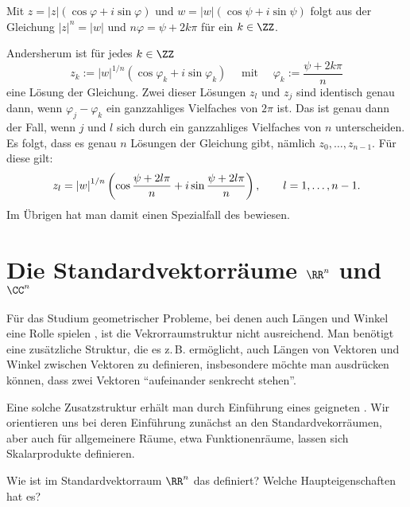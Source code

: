 \begin{antwort}
  Mit 
  $z = |z| (\cos \varphi + i \sin \varphi)$ und 
  $w=  |w| (\cos \psi + i \sin \psi)$ folgt aus der Gleichung  
  $|z|^n = |w|$ und $n\varphi = \psi + 2k\pi$ für ein 
  $k\in \ZZ$.

  Andersherum ist für jedes $k\in\ZZ$ 
  \[
  z_k := \left|w\right|^{1/n}  ( \cos \varphi_k + i\sin \varphi_k ) 
  \quad\text{ mit }\quad
  \varphi_k := \frac{\psi + 2k\pi}{n}
  \]
  eine Lösung der Gleichung. Zwei dieser Lösungen $z_l$ und 
  $z_j$ sind identisch genau dann, wenn $\varphi_j - \varphi_k$ 
  ein ganzzahliges Vielfaches von $2\pi$ ist. 
  Das ist genau dann der Fall, wenn 
  $j$ und $l$ sich durch ein ganzzahliges Vielfaches 
  von $n$ unterscheiden. Es folgt, dass es genau $n$ Lösungen 
  der Gleichung gibt, nämlich $z_0,\ldots,z_{n-1}$. 
  Für diese gilt:
  \begin{equation}
    z_l = \left| w \right|^{1/n} \left( \cos\frac{\psi + 2l\pi}{n} + 
      i\sin \frac{\psi + 2l\pi}{n} \right), \qquad l = 1,\ldots, n-1. 
    \notag
  \end{equation}
  Im Übrigen hat man damit 
  einen Spezialfall des 
   bewiesen. \AntEnd
\end{antwort} 




\section{Die Standardvektorräume $\RR^n$ und $\CC^n$}


Für das Studium geometrischer Probleme, bei denen auch Längen und Winkel 
eine Rolle spielen , ist die Vekrorraumstruktur nicht ausreichend. Man benötigt 
eine zusätzliche Struktur, die es z.\,B. ermöglicht, auch Längen von Vektoren 
und Winkel zwischen Vektoren zu definieren, insbesondere möchte man ausdrücken 
können, dass zwei Vektoren "`aufeinander senkrecht stehen"'. 

Eine solche Zusatzstruktur erhält man durch Einführung eines geigneten 
. Wir orientieren uns bei deren Einführung 
zunächst an den Standardvekorräumen, aber auch für allgemeinere Räume, etwa 
Funktionenräume, lassen sich Skalarprodukte definieren.




\begin{frage}
  \label{skalarRR}
  Wie ist im Standardvektorraum $\RR^n$ das 
   definiert? 
  Welche Haupteigenschaften hat es?
\end{frage}

